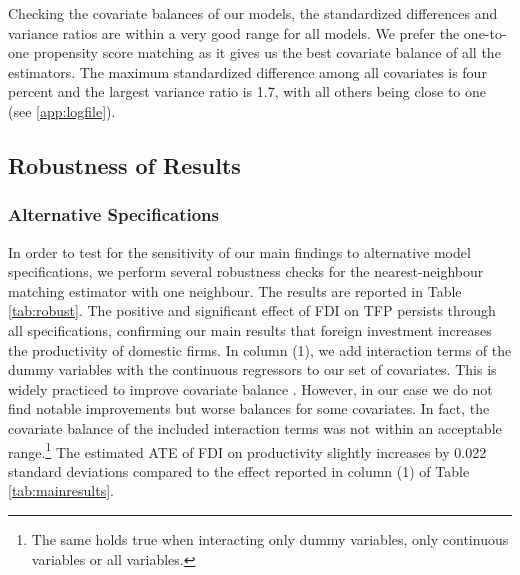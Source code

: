 \documentclass[a4paper,11pt]{scrartcl}
\begin{document}
Checking the covariate balances of our models, the standardized differences and variance ratios are within a very good range for all models. We prefer the one-to-one propensity score matching as it gives us the best covariate balance of all the estimators. The maximum standardized difference among all covariates is four percent and the largest variance ratio is 1.7, with all others being close to one (see \ref{app:logfile}). 


\subsection{Robustness of Results}

\subsubsection*{Alternative Specifications} 
In order to test for the sensitivity of our main findings to alternative model specifications, we perform several robustness checks for the nearest-neighbour matching estimator with one neighbour. The results are reported in Table \ref{tab:robust}. The positive and significant effect of FDI on TFP persists through all specifications, confirming our main results that foreign investment increases the productivity of domestic firms. In column (1), we add interaction terms of the dummy variables with the continuous regressors to our set of covariates. This is widely practiced to improve covariate balance \citep{Caliendo08}. However, in our case we do not find notable improvements but worse balances for some covariates. In fact, the covariate balance of the included interaction terms was not within an acceptable range.\footnote{The same holds true when interacting only dummy variables, only continuous variables or all variables.} The estimated ATE of FDI on productivity slightly increases by 0.022 standard deviations compared to the effect reported in column (1) of Table \ref{tab:mainresults}. 
\newpage
\end{document}
